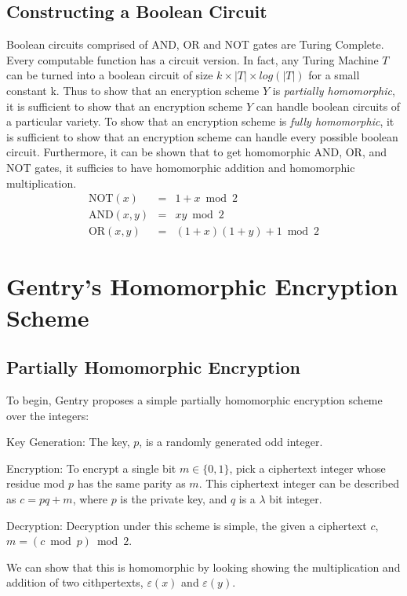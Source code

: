 \documentclass[a4paper,10pt]{article}
\begin{document}
\subsection{Constructing a Boolean Circuit}
Boolean circuits comprised of AND, OR and NOT gates are Turing Complete. Every computable function has a circuit version. In fact, any Turing Machine $T$ can be turned into a boolean circuit of size $k \times |T| \times log(|T|)$ for a small constant k. Thus to show that an encryption scheme $Y$ is \textit{partially homomorphic}, it is sufficient to show that an encryption scheme $Y$ can handle boolean circuits of a particular variety. To show that an encryption scheme is \textit{fully homomorphic}, it is sufficient to show that an encryption scheme can handle every possible boolean circuit. Furthermore, it can be shown that to get homomorphic AND, OR, and NOT gates, it sufficies to have homomorphic addition and homomorphic multiplication.
\begin{eqnarray*}
\mathrm{NOT}(x) &=& 1+x \bmod 2\\
\mathrm{AND}(x,y) &=& xy \bmod 2\\
\mathrm{OR}(x,y) &=& (1+x)(1+y) + 1 \bmod 2
\end{eqnarray*}

\section{Gentry's Homomorphic Encryption Scheme}

\subsection{Partially Homomorphic Encryption}
To begin, Gentry proposes a simple partially homomorphic encryption
scheme over the integers:

Key Generation: The key, $p$, is a randomly generated odd integer.

Encryption: To encrypt a single bit $ m \in \{0,1\} $, pick a
ciphertext integer whose residue mod $ p $ has the same parity as
$m$. This ciphertext integer can be described as $ c = pq + m $, where
$ p $ is the private key, and $q$ is a $\lambda$ bit integer.

Decryption: Decryption under this scheme is simple, the given a
ciphertext $c$, $ m = ( c \bmod p) \bmod 2 $.

We can show that this is homomorphic by looking showing the
multiplication and addition of two cithpertexts, $ \varepsilon(x) $
and $ \varepsilon(y) $.
\end{document}
